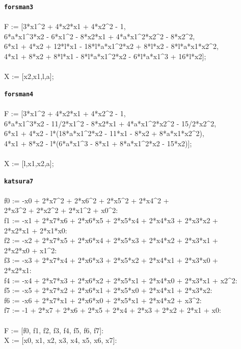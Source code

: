 \documentclass[letterpaper,12pt,titlepage,oneside,final]{book}
\newenvironment{codefont}{\footnotesize\ttfamily}{\par}
\begin{document}
\begin{appendices}
\noindent\textbf{\texttt{forsman3}}\\\\
\noindent\begin{codefont}
  F := [3*x1\^{}2 + 4*x2*x1 + 4*x2\^{}2 - 1,\\
  6*a*x1\^{}3*x2 - 6*x1\^{}2 - 8*x2*x1 + 4*a*x1\^{}2*x2\^{}2 - 8*x2\^{}2,\\
  6*x1 + 4*x2 + 12*l*x1 - 18*l*a*x1\^{}2*x2 + 8*l*x2 - 8*l*a*x1*x2\^{}2,\\
  4*x1 + 8*x2 + 8*l*x1 - 8*l*a*x1\^{}2*x2 - 6*l*a*x1\^{}3 + 16*l*x2];\\
        \\
  X := [x2,x1,l,a];\\
\end{codefont}

\noindent\textbf{\texttt{forsman4}}\\\\
\noindent\begin{codefont}
  F := [3*x1\^{}2 + 4*x2*x1 + 4*x2\^{}2 - 1,\\
  6*a*x1\^{}3*x2 - 11/2*x1\^{}2 - 8*x2*x1 + 4*a*x1\^{}2*x2\^{}2 - 15/2*x2\^{}2,\\
  6*x1 + 4*x2 - l*(18*a*x1\^{}2*x2 - 11*x1 - 8*x2 + 8*a*x1*x2\^{}2),\\
  4*x1 + 8*x2 - l*(6*a*x1\^{}3 - 8*x1 + 8*a*x1\^{}2*x2 - 15*x2)];\\
        \\
  X := [l,x1,x2,a];\\
\end{codefont}

\noindent\textbf{\texttt{katsura7}}\\\\
\noindent\begin{codefont}
  f0 := -x0 + 2*x7\^{}2 + 2*x6\^{}2 + 2*x5\^{}2 + 2*x4\^{}2 + \\2*x3\^{}2 + 2*x2\^{}2 + 2*x1\^{}2 + x0\^{}2:\\
  f1 := -x1 + 2*x7*x6 + 2*x6*x5 + 2*x5*x4 + 2*x4*x3 + 2*x3*x2 + \\2*x2*x1 + 2*x1*x0:\\
  f2 := -x2 + 2*x7*x5 + 2*x6*x4 + 2*x5*x3 + 2*x4*x2 + 2*x3*x1 + \\2*x2*x0 + x1\^{}2:\\
  f3 := -x3 + 2*x7*x4 + 2*x6*x3 + 2*x5*x2 + 2*x4*x1 + 2*x3*x0 + \\2*x2*x1:\\
  f4 := -x4 + 2*x7*x3 + 2*x6*x2 + 2*x5*x1 + 2*x4*x0 + 2*x3*x1 + x2\^{}2:\\
  f5 := -x5 + 2*x7*x2 + 2*x6*x1 + 2*x5*x0 + 2*x4*x1 + 2*x3*x2:\\
  f6 := -x6 + 2*x7*x1 + 2*x6*x0 + 2*x5*x1 + 2*x4*x2 + x3\^{}2:\\
  f7 := -1 + 2*x7 + 2*x6 + 2*x5 + 2*x4 + 2*x3 + 2*x2 + 2*x1 + x0:\\
  \\
  F := [f0, f1, f2, f3, f4, f5, f6, f7]:\\
  X := [x0, x1, x2, x3, x4, x5, x6, x7]:\\
\end{codefont}



\end{appendices}
\end{document}
